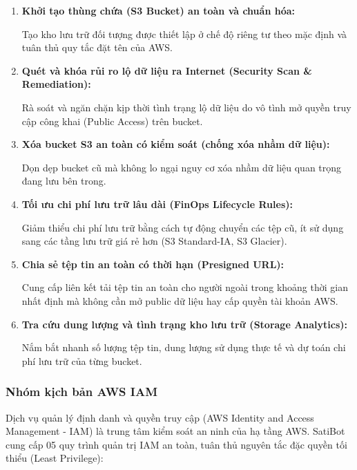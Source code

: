 \documentclass[a4paper,12pt]{article}
\begin{document}
\begin{enumerate}
  \item \textbf{Khởi tạo thùng chứa (S3 Bucket) an toàn và chuẩn hóa:}

Tạo kho lưu trữ đối tượng được thiết lập ở chế độ riêng tư theo mặc định và tuân thủ quy tắc đặt tên của AWS.

  \item \textbf{Quét và khóa rủi ro lộ dữ liệu ra Internet (Security Scan \& Remediation):}

Rà soát và ngăn chặn kịp thời tình trạng lộ dữ liệu do vô tình mở quyền truy cập công khai (Public Access) trên bucket.


  \item \textbf{Xóa bucket S3 an toàn có kiểm soát (chống xóa nhầm dữ liệu):}

Dọn dẹp bucket cũ mà không lo ngại nguy cơ xóa nhầm dữ liệu quan trọng đang lưu bên trong.


  \item \textbf{Tối ưu chi phí lưu trữ lâu dài (FinOps Lifecycle Rules):}

Giảm thiểu chi phí lưu trữ bằng cách tự động chuyển các tệp cũ, ít sử dụng sang các tầng lưu trữ giá rẻ hơn (S3 Standard-IA, S3 Glacier).


  \item \textbf{Chia sẻ tệp tin an toàn có thời hạn (Presigned URL):}

  Cung cấp liên kết tải tệp tin an toàn cho người ngoài trong khoảng thời gian nhất định mà không cần mở public dữ liệu hay cấp quyền tài khoản AWS.


  \item \textbf{Tra cứu dung lượng và tình trạng kho lưu trữ (Storage Analytics):}

Nắm bắt nhanh số lượng tệp tin, dung lượng sử dụng thực tế và dự toán chi phí lưu trữ của từng bucket.

\end{enumerate}

\subsubsection{Nhóm kịch bản AWS IAM}

Dịch vụ quản lý định danh và quyền truy cập (AWS Identity and Access Management - IAM) là trung tâm kiểm soát an ninh của hạ tầng AWS. SatiBot cung cấp 05 quy trình quản trị IAM an toàn, tuân thủ nguyên tắc đặc quyền tối thiểu (Least Privilege):
\end{document}

